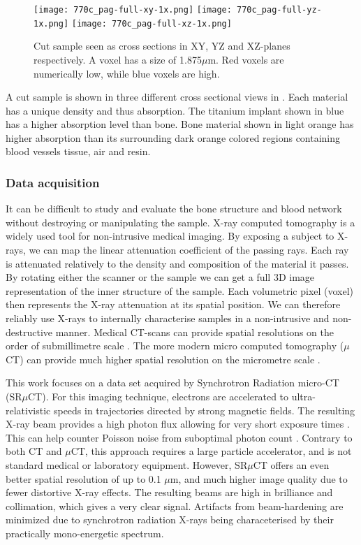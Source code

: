 \begin{figure}
\centering
\texttt{[image: 770c\_pag-full-xy-1x.png]}
\texttt{[image: 770c\_pag-full-yz-1x.png]}
\texttt{[image: 770c\_pag-full-xz-1x.png]}
\caption{Cut sample seen as cross sections in XY, YZ and XZ-planes respectively. A voxel has a size
of 1.875$\mu$m. Red voxels are numerically low, while blue voxels are high.}
\label{fig:3viewsample}
\end{figure}

A cut sample is shown in three different cross sectional views in . Each
material has a unique density and thus absorption. The titanium implant shown in blue has a
higher absorption level than bone. Bone material shown in light orange has higher absorption
than its surrounding dark orange colored regions containing blood vessels tissue, air and resin.

\subsubsection{Data acquisition}

It can be difficult to study and evaluate the bone structure and blood network without destroying
or manipulating the sample. X-ray computed tomography is a widely used tool for non-intrusive medical
imaging. By exposing a subject to X-rays, we can map the linear attenuation coefficient of the passing
rays. Each ray is attenuated relatively to the density and composition of the material it passes.
By rotating either the scanner or the sample we can get a full 3D image representation of the inner
structure of the sample. Each volumetric pixel (voxel) then represents the X-ray attenuation at its
spatial position. We can therefore reliably use X-rays to internally characterise samples in a
non-intrusive and non-destructive manner. Medical CT-scans can provide spatial resolutions on the
order of submillimetre scale \citep{medicalct}. The more modern micro computed tomography ($\mu$CT)
can provide much higher spatial resolution on the micrometre scale \citep{srexptime}.

This work focuses on a data set acquired by Synchrotron Radiation micro-CT (SR$\mu$CT). For this
imaging technique, electrons are accelerated to ultra-relativistic speeds in trajectories directed
by strong magnetic fields. The resulting X-ray beam provides a high photon flux allowing for very
short exposure times \citep{srexptime}. This can help counter Poisson noise from suboptimal photon
count \citep{srnoise}. Contrary to both CT and $\mu$CT, this approach requires a large particle
accelerator, and is not standard medical or laboratory equipment. However, SR$\mu$CT  offers an
even better spatial resolution of up to 0.1 $\mu$m, and much higher image quality due to fewer
distortive X-ray effects. The resulting beams are high in brilliance and collimation, which gives
a very clear signal. Artifacts from beam-hardening are minimized due to synchrotron radiation
X-rays being characeterised by their practically mono-energetic spectrum.

